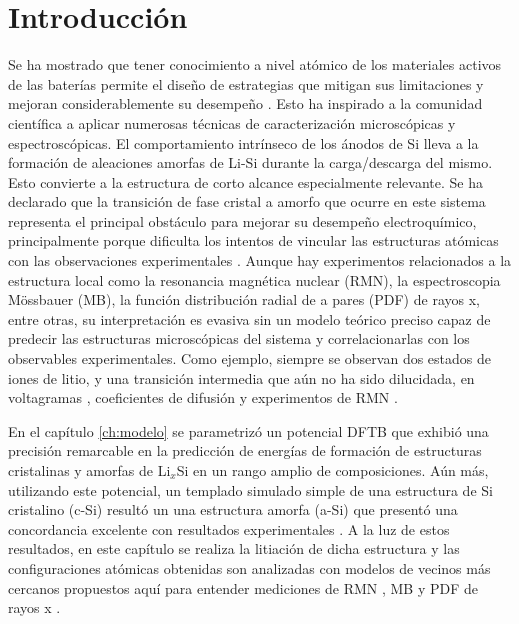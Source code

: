 \section{Introducción}

Se ha mostrado que tener conocimiento a nivel atómico de los materiales 
activos de las baterías permite el diseño de estrategias que mitigan sus 
limitaciones y mejoran considerablemente su desempeño \cite{liu2019review}.
Esto ha inspirado a la comunidad científica a aplicar numerosas técnicas 
de caracterización microscópicas y espectroscópicas. El comportamiento 
intrínseco de los ánodos de Si lleva a la formación de aleaciones amorfas de 
Li-Si durante la carga/descarga del mismo. Esto convierte a la estructura
de corto alcance especialmente relevante. Se ha declarado que la transición de 
fase cristal a amorfo que ocurre en este sistema representa el principal 
obstáculo para mejorar su desempeño electroquímico, principalmente porque 
dificulta los intentos de vincular las estructuras atómicas con las 
observaciones experimentales \cite{key2011}. Aunque hay experimentos 
relacionados a la estructura local como la resonancia magnética nuclear (RMN),
la espectroscopia Mössbauer (MB), la función distribución radial de a pares 
(PDF) de rayos x, entre otras, su interpretación es evasiva sin un modelo 
teórico preciso capaz de predecir las estructuras microscópicas del sistema
y correlacionarlas con los observables experimentales. Como ejemplo, siempre 
se observan dos estados de iones de litio, y una transición intermedia que aún 
no ha sido dilucidada, en voltagramas \cite{pan2019}, coeficientes de 
difusión \cite{ding2009} y experimentos de RMN \cite{key2009}.

En el capítulo \ref{ch:modelo} se parametrizó un potencial DFTB que exhibió 
una precisión remarcable en la predicción de energías de formación de 
estructuras cristalinas y amorfas de Li$_x$Si en un rango amplio de 
composiciones. Aún más, utilizando este potencial, un templado simulado simple
de una estructura de Si cristalino (c-Si) resultó un una estructura amorfa 
(a-Si) que presentó una concordancia excelente con resultados experimentales
\cite{laaziri1999}. A la luz de estos resultados, en este capítulo se realiza
la litiación de dicha estructura y las configuraciones atómicas obtenidas 
son analizadas con modelos de vecinos más cercanos propuestos aquí para 
entender mediciones de RMN \cite{ogata2014, key2011, koster2011, key2009}, 
MB \cite{li2009} y PDF de rayos x \cite{key2011, laaziri1999}.
